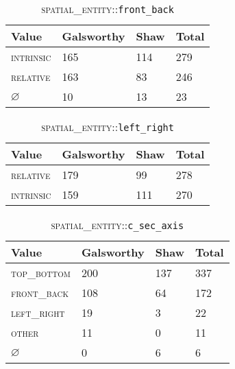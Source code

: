 \documentclass[11pt]{article}
\begin{document}
\begin{appendix}
    \begin{table}[here]
    \begin{center}
    \begin{tabular}
        {|l|l|l|l|}
        \hline  \textbf{Value} & \textbf{Galsworthy} & \textbf{Shaw} & \textbf{Total} \\
        \hline \textsc{intrinsic} & 165 & 114 & 279 \\
        \hline \textsc{relative} & 163 & 83 & 246   \\
        \hline $\varnothing$ & 10 & 13 & 23         \\
        \hline
    \end{tabular}
    \caption{\textsc{spatial\_entity}::\texttt{front\_back}}
    \label{tab:front_back-counts}
    \end{center}
    \end{table}

    \begin{table}[here]
    \begin{center}
    \begin{tabular}
        {|l|l|l|l|}
        \hline  \textbf{Value} & \textbf{Galsworthy} & \textbf{Shaw} & \textbf{Total} \\
        \hline  \textsc{relative} & 179 & 99 & 278   \\
        \hline  \textsc{intrinsic} & 159 & 111 & 270 \\
        \hline
    \end{tabular}
    \caption{\textsc{spatial\_entity}::\texttt{left\_right}}
    \label{tab:left_right-counts}
    \end{center}
    \end{table}

    \begin{table}[here]
    \begin{center}
    \begin{tabular}
        {|l|l|l|l|}
        \hline  \textbf{Value} & \textbf{Galsworthy} & \textbf{Shaw} & \textbf{Total} \\
        \hline  \textsc{top\_bottom} & 200 & 137 & 337 \\
        \hline  \textsc{front\_back} & 108 & 64 & 172  \\
        \hline  \textsc{left\_right} & 19 & 3 & 22     \\
        \hline  \textsc{other} & 11 & 0 & 11           \\
        \hline  $\varnothing$ & 0 & 6 &  6             \\
        \hline
    \end{tabular}
    \caption{\textsc{spatial\_entity}::\texttt{c\_sec\_axis}}
    \label{tab:c_sec_axis-counts}
    \end{center}
    \end{table}


\end{appendix}
\end{document}
